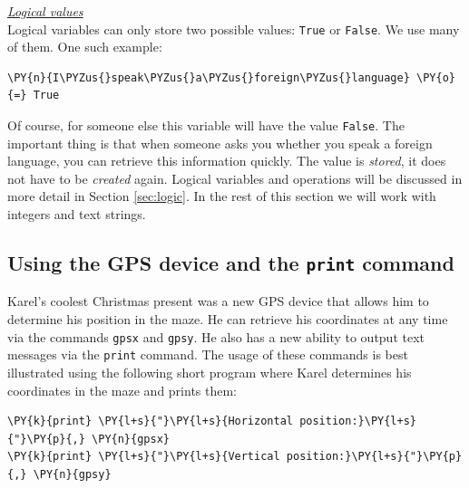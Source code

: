 \noindent
\underline{\em Logical values}\\

\noindent
Logical variables can only store two possible values:
{\tt True} or {\tt False}. We use many of them. One such example: \\

\begin{bbox}
\begin{Verbatim}[commandchars=\\\{\}]
\PY{n}{I\PYZus{}speak\PYZus{}a\PYZus{}foreign\PYZus{}language} \PY{o}{=} True
\end{Verbatim}
\end{bbox}
\vspace{6mm}

\noindent
Of course, for someone else this variable will have the value {\tt False}. The important 
thing is that when someone asks you whether you speak a foreign language, you can retrieve 
this information quickly. The value is {\em stored}, it does not have to be {\em created}
again. Logical variables and operations will be discussed in more detail in Section 
\ref{sec:logic}. In the rest of this section we will work with integers and text strings.

\subsection[\ \ Using the GPS device and the {\tt print} command]{Using the GPS device and the {\tt print} command}

Karel's coolest Christmas present was a new GPS device that allows him to determine his position 
in the maze. He can retrieve his coordinates at any time via the 
commands {\tt gpsx} and {\tt gpsy}. He also has a new ability to output text messages via the {\tt print} 
command. The usage of these commands is best illustrated using the following short program where 
Karel determines his coordinates in the maze and prints them:\\

\begin{bbox}
\begin{Verbatim}[commandchars=\\\{\}]
\PY{k}{print} \PY{l+s}{"}\PY{l+s}{Horizontal position:}\PY{l+s}{"}\PY{p}{,} \PY{n}{gpsx}
\PY{k}{print} \PY{l+s}{"}\PY{l+s}{Vertical position:}\PY{l+s}{"}\PY{p}{,} \PY{n}{gpsy}
\end{Verbatim}
\end{bbox}
\vspace{6mm}

